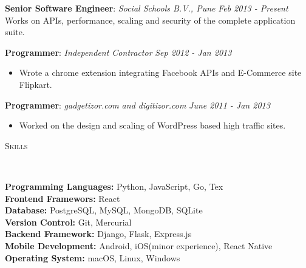 \documentclass[9pt]{article}
\newenvironment{changemargin}[2]{%
  \begin{list}{}{%
    \setlength{\topsep}{0pt}%
    \setlength{\leftmargin}{#1}%
    \setlength{\rightmargin}{#2}%
    \setlength{\listparindent}{\parindent}%
    \setlength{\itemindent}{\parindent}%
    \setlength{\parsep}{\parskip}%
  }%
  \item[]}{\end{list}
}
\newcommand{\lineover}{
    \begin{changemargin}{-0.05in}{-0.05in}
        \vspace*{-8pt}
        \hrulefill \\
        \vspace*{-2pt}
    \end{changemargin}
}
\newcommand{\header}[1]{
    \begin{changemargin}{-0.5in}{-0.5in}
        \scshape{#1}\\
    \lineover
    \end{changemargin}
}
\newenvironment{body} {
    \vspace*{-16pt}
    \begin{changemargin}{-0.25in}{-0.5in}
  }
    {\end{changemargin}
}
\begin{document}
\begin{body}
    \vspace{14pt}
    \textbf{Senior Software Engineer}: \emph{Social Schools B.V., Pune} \hfill \emph{Feb 2013 - Present}\\
    Works on APIs, performance, scaling and security of the complete application suite.
    \vspace*{-4pt}

    \vspace{14pt}
    \textbf {Programmer}: \emph{Independent Contractor} \hfill \emph{Sep 2012 - Jan 2013}\\
    \vspace*{-4pt}
    \begin{itemize} \itemsep -0pt
        \item Wrote a chrome extension integrating Facebook APIs and E-Commerce site Flipkart.
    \end{itemize}

    \textbf{Programmer}: \emph{gadgetizor.com and digitizor.com} \hfill \emph{June 2011 - Jan 2013}\\
    \vspace*{-4pt}
    \begin{itemize} \itemsep -0pt  %
        \item Worked on the design and scaling of WordPress based high traffic sites.
    \end{itemize}

\end{body}

\smallskip


\header{Skills}

\begin{body}
    \vspace{14pt}
    \textbf{Programming Languages:}{} Python, JavaScript, Go, Tex\\
    \textbf{Frontend Framewors:}{} React\\
    \textbf{Database:}{} PostgreSQL, MySQL, MongoDB, SQLite\\
    \textbf{Version Control:}{} Git, Mercurial\\
    \textbf{Backend Framework:}{} Django, Flask, Express.js\\
    \textbf{Mobile Development:}{} Android, iOS(minor experience), React Native\\
    \textbf{Operating System:}{} macOS, Linux, Windows\\
\end{body}
\end{document}
